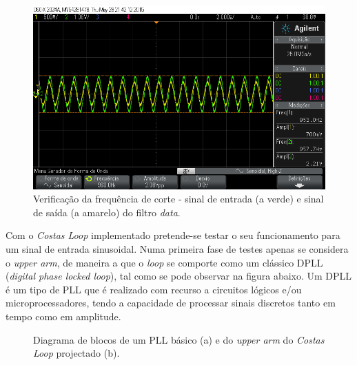 \documentclass[11pt]{article}
\numberwithin{equation}{section}
\begin{document}
\begin{figure}[H]
	\centering
	\includegraphics[keepaspectratio=true, scale=0.37]{exps/filtro_1k_freqcorte}
	\caption{Verificação da frequência de corte - sinal de entrada (a verde) e sinal de saída (a amarelo) do filtro \textit{data}.}
	\vspace{-0.8em}
\end{figure} 





Com o \textit{Costas Loop} implementado pretende-se testar o seu funcionamento para um sinal de entrada sinusoidal. Numa primeira fase de testes apenas se considera o \textit{upper arm}, de maneira a que o \textit{loop} se comporte como um clássico DPLL (\textit{digital phase locked loop}), tal como se pode observar na figura abaixo. Um DPLL é um tipo de PLL que é realizado com recurso a circuitos lógicos e/ou microprocessadores, tendo a capacidade de processar sinais discretos tanto em tempo como em amplitude.

\begin{figure}[H]
	\centering
	\hspace{8mm}
	\vspace{-0.8em}
	\caption{Diagrama de blocos de um PLL básico (a) e do \textit{upper arm} do \textit{Costas Loop} projectado (b).}
	\vspace{-0.8em}
\end{figure}
\end{document}
